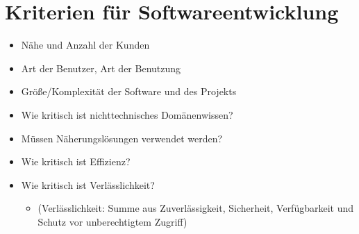 \section{Kriterien für Softwareentwicklung}

\begin{tcolorbox}[title=Kriterien für Softwareentwicklung]
    \begin{itemize}
        \item Nähe und Anzahl der Kunden
        \item Art der Benutzer, Art der Benutzung
        \item Größe/Komplexität der Software und des Projekts
        \item Wie kritisch ist nichttechnisches Domänenwissen?
        \item Müssen Näherungslösungen verwendet werden?
        \item Wie kritisch ist Effizienz?
        \item Wie kritisch ist Verlässlichkeit?
        \begin{itemize}
            \item[] (Verlässlichkeit: Summe aus Zuverlässigkeit, Sicherheit, Verfügbarkeit und Schutz vor unberechtigtem Zugriff)
        \end{itemize}
    \end{itemize}
\end{tcolorbox}